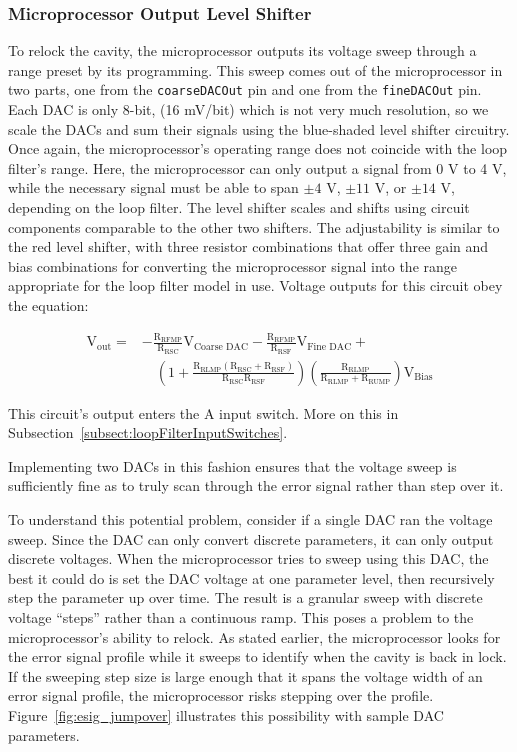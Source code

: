 \documentclass[10pt]{report}
\newcommand{\coarseDACOut}[0] {\texttt{coarseDACOut}}
\newcommand{\fineDACOut}[0] {\texttt{fineDACOut}}
\begin{document}
\subsubsection{Microprocessor Output Level Shifter}

To relock the cavity, the microprocessor outputs its voltage sweep through a range preset by its programming. This sweep comes out of the microprocessor in two parts, one from the \coarseDACOut{} {} pin and one from the \fineDACOut{} pin. Each DAC is only 8-bit, (16 mV/bit) which is not very much resolution, so we scale the DACs and sum their signals using the blue-shaded level shifter circuitry. Once again, the microprocessor's operating range does not coincide with the loop filter's range. Here, the microprocessor can only output a signal from 0 V to 4 V, while the necessary signal must be able to span $\pm4$ V, $\pm11$ V, or $\pm14$ V, depending on the loop filter. The level shifter scales and shifts using circuit components comparable to the other two shifters. The adjustability is similar to the red level shifter, with three resistor combinations that offer three gain and bias combinations for converting the microprocessor signal into the range appropriate for the loop filter model in use. Voltage outputs for this circuit obey the equation:

\begin{equation}
	\begin{aligned}
	\text{V}_{\text{out}}=& -\frac{\text{R}_{\text{RFMP}}}{\text{R}_{\text{RSC}}} \text{V}_{\text{Coarse DAC}} -\frac{\text{R}_{\text{RFMP}}}{\text{R}_{\text{RSF}}} \text{V}_{\text{Fine DAC}} + \\
	& \quad \left(1+\frac{\text{R}_{\text{RLMP}}({\text{R}_{\text{RSC}}+\text{R}_{\text{RSF}}})}{\text{R}_{\text{RSC}}\text{R}_{\text{RSF}}}\right)\left(\frac{\text{R}_{\text{RLMP}}}{\text{R}_{\text{RLMP}}+\text{R}_{\text{RUMP}}}\right) \text{V}_{\text{Bias}}
	\end{aligned}	
\end{equation}

This circuit's output enters the A input switch. More on this in Subsection~\ref{subsect:loopFilterInputSwitches}.

Implementing two DACs in this fashion ensures that the voltage sweep is sufficiently fine as to truly scan through the error signal rather than step over it.

To understand this potential problem, consider if a single DAC ran the voltage sweep. Since the DAC can only convert discrete parameters, it can only output discrete voltages. When the microprocessor tries to sweep using this DAC, the best it could do is set the DAC voltage at one parameter level, then recursively step the parameter up over time. The result is a granular sweep with discrete voltage ``steps'' rather than a continuous ramp. This poses a problem to the microprocessor's ability to relock. As stated earlier, the microprocessor looks for the error signal profile while it sweeps to identify when the cavity is back in lock. If the sweeping step size is large enough that it spans the voltage width of an error signal profile, the microprocessor risks stepping over the profile. Figure~\ref{fig:esig_jumpover} illustrates this possibility with sample DAC parameters.
\end{document}
